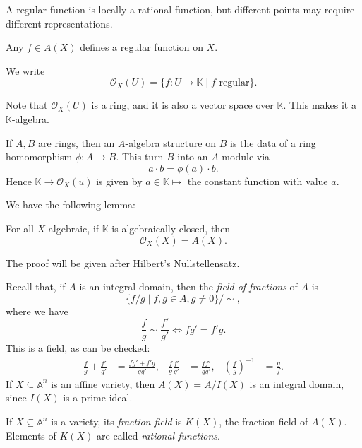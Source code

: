 \documentclass[12pt]{article}
\begin{document}
A regular function is locally a rational function, but different points may require different representations.

\begin{exbox}
	Any $f \in A(X)$ defines a regular function on $X$.
\end{exbox}

\begin{definition}
	We write
	\[
		\mathcal{O}_X(U) = \{f : U \to \mathbb{K} \mid f \text{ regular}\}.
	\]
\end{definition}

Note that $\mathcal{O}_X(U)$ is a ring, and it is also a vector space over $\mathbb{K}$. This makes it a $\mathbb{K}$-algebra.

\begin{definition}
	If $A, B$ are rings, then an $A$-algebra structure on $B$ is the data of a ring homomorphism $\phi : A \to B$. This turn $B$ into an $A$-module via
	\[
	a \cdot b = \phi(a) \cdot b.
	\]
	Hence $\mathbb{K} \to \mathcal{O}_X(u)$ is given by $a \in \mathbb{K} \mapsto$ the constant function with value $a$.
\end{definition}


We have the following lemma:
\begin{lemma}\label{lem:rat_alg}
	For all $X$ algebraic, if $\mathbb{K}$ is algebraically closed, then
	\[
	\mathcal{O}_X(X) = A(X).
	\]
\end{lemma}
The proof will be given after Hilbert's Nullstellensatz.

Recall that, if $A$ is an integral domain, then the \emph{field of fractions} of $A$ is
\[
	\{f/g \mid f, g \in A, g \neq 0\} / \sim,
\]
where we have
\[
\frac{f}{g} \sim \frac{f'}{g'} \iff fg' = f'g.
\]
This is a field, as can be checked:
\begin{align*}
	\frac fg + \frac{f'}{g'} &= \frac{fg' + f'g}{gg'}, & \frac fg \frac{f'}{g'} &= \frac{ff'}{gg'}, & \left(\frac{f}{g}\right)^{-1} \!\!\!&= \frac gf.
\end{align*}
If $X \subseteq \mathbb{A}^n$ is an affine variety, then $A(X) = A/I(X)$ is an integral domain, since $I(X)$ is a prime ideal.

\begin{definition}
	If $X \subseteq \mathbb{A}^n$ is a variety, its \emph{fraction field} is $K(X)$, the fraction field of $A(X)$. Elements of $K(X)$ are called \emph{rational functions}.
\end{definition}
\end{document}

